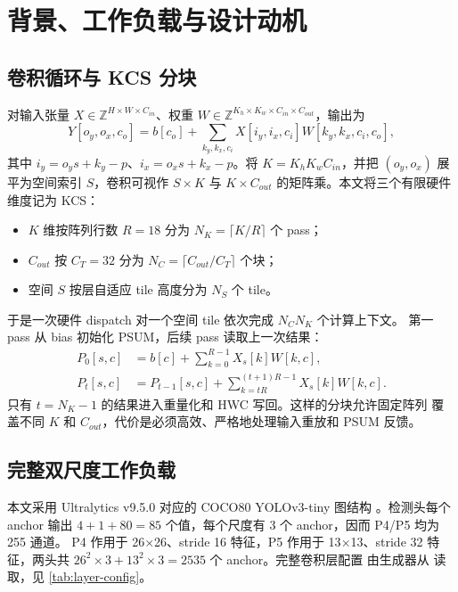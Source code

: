\section{背景、工作负载与设计动机}
\label{sec:background}

\subsection{卷积循环与 KCS 分块}

对输入张量 $X\in\mathbb{Z}^{H\times W\times C_{in}}$、权重
$W\in\mathbb{Z}^{K_h\times K_w\times C_{in}\times C_{out}}$，输出为
\begin{equation}
Y[o_y,o_x,c_o]=b[c_o]+\sum_{k_y,k_x,c_i}
 X[i_y,i_x,c_i]W[k_y,k_x,c_i,c_o],
\end{equation}
其中 $i_y=o_y s+k_y-p$、$i_x=o_x s+k_x-p$。将
$K=K_hK_wC_{in}$，并把 $(o_y,o_x)$ 展平为空间索引 $S$，卷积可视作
$S\times K$ 与 $K\times C_{out}$ 的矩阵乘。本文将三个有限硬件维度记为
KCS：
\begin{itemize}[leftmargin=1.8em]
  \item $K$ 维按阵列行数 $R=18$ 分为 $N_K=\lceil K/R\rceil$ 个 pass；
  \item $C_{out}$ 按 $C_T=32$ 分为 $N_C=\lceil C_{out}/C_T\rceil$ 个块；
  \item 空间 $S$ 按层自适应 tile 高度分为 $N_S$ 个 tile。
\end{itemize}
于是一次硬件 dispatch 对一个空间 tile 依次完成 $N_C N_K$ 个计算上下文。
第一 pass 从 bias 初始化 PSUM，后续 pass 读取上一次结果：
\begin{align}
P_0[s,c]&=b[c]+\sum_{k=0}^{R-1}X_s[k]W[k,c],\\
P_t[s,c]&=P_{t-1}[s,c]+\sum_{k=tR}^{(t+1)R-1}X_s[k]W[k,c].
\end{align}
只有 $t=N_K-1$ 的结果进入重量化和 HWC 写回。这样的分块允许固定阵列
覆盖不同 $K$ 和 $C_{out}$，代价是必须高效、严格地处理输入重放和 PSUM
反馈。

\subsection{完整双尺度工作负载}

本文采用 Ultralytics v9.5.0 对应的 COCO80 YOLOv3-tiny 图结构
\cite{ultralyticsv95,coco2014}。检测头每个 anchor 输出
$4+1+80=85$ 个值，每个尺度有 3 个 anchor，因而 P4/P5 均为 255 通道。
P4 作用于 26$\times$26、stride 16 特征，P5 作用于 13$\times$13、stride 32
特征，两头共 $26^2\times3+13^2\times3=2535$ 个 anchor。完整卷积层配置
由生成器从  读取，见
\cref{tab:layer-config}。

